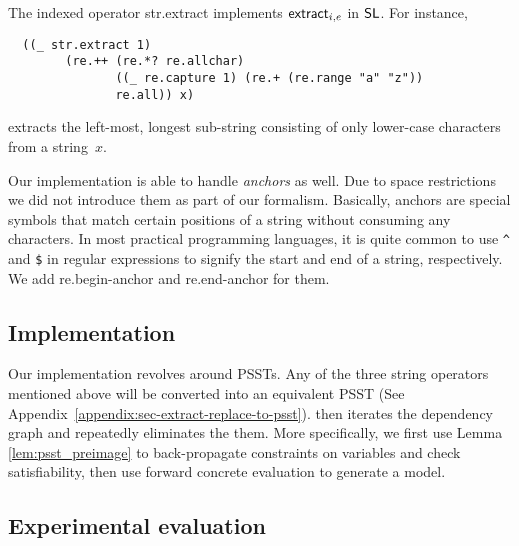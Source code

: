 The indexed operator {\sf str.extract} implements $\mathsf{extract}_{i, e}$ in
$\mathsf{SL}$. For instance,
%
\begin{verbatim}
  ((_ str.extract 1)
        (re.++ (re.*? re.allchar)
               ((_ re.capture 1) (re.+ (re.range "a" "z"))
               re.all)) x)
\end{verbatim}
%
extracts the left-most, longest sub-string consisting of only lower-case
characters from a string~$x$.

Our implementation is able to handle \textit{anchors} as well. Due to space restrictions we did not introduce them as part of our formalism. Basically, anchors are special symbols that match certain positions of a string without consuming any characters. In most practical programming languages, it is quite common to use \verb!^! and \verb!$! in regular expressions to signify the start and end of a string, respectively. We add \textsf{re.begin-anchor} and \textsf{re.end-anchor} for them.

\subsection{Implementation}

Our implementation revolves around PSSTs. Any of the three string operators mentioned above will be converted into an equivalent PSST (See Appendix~\ref{appendix:sec-extract-replace-to-psst}). {\ostrich} then iterates the dependency graph and repeatedly eliminates the them. More specifically, we first use Lemma \ref{lem:psst_preimage} to back-propagate constraints on variables and check satisfiability, then use forward concrete evaluation to generate a model. 

\subsection{Experimental evaluation}

